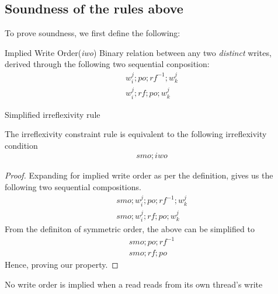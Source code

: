 \subsection{Soundness of the rules above}

    To prove soundness, we first define the following: 

    \begin{definition}{Implied Write Order(\emph{iwo})}
        Binary relation between any two \emph{distinct} writes, derived through the following two sequential conposition:  
        \begin{align*}
            w_i^j;po;rf^{-1};w_k^j \\
            w_i^j;rf;po;w_k^j 
        \end{align*}
    \end{definition}


    \begin{property}{Simplified irreflexivity rule}
        
        The irreflexivity constraint rule is equivalent to the following irreflexivity condition 
        \begin{align}
            smo;iwo
        \end{align}
    \end{property}

    \begin{proof}
        Expanding for implied write order as per the definition, gives us the following two sequential compositions. 
        \begin{align}
            smo;w_i^j;po;rf^{-1};w_k^j \\
            smo;w_i^j;rf;po;w_k^j 
        \end{align}
        From the definiton of symmetric order, the above can be simplified to
        \begin{align}
            smo;po;rf^{-1} \\
            smo;rf;po 
        \end{align}
        Hence, proving our property. 
    \end{proof}


    \begin{property}
        No write order is implied when a read reads from its own thread's write
    \end{property}

